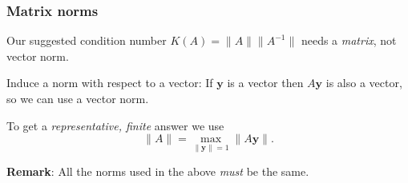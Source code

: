 \documentclass{beamer}
\newcommand{\bfm}[1]{{\boldsymbol{#1}}}
\begin{document}
 \begin{frame}
   \frametitle{Matrix norms}

   Our suggested condition number $K(A) = \| A \| \| A^{-1} \|$ needs
   a \emph{matrix}, not vector norm.

   \vspace{1ex}

   Induce a norm with respect to a vector: If $\bfm{y}$ is a vector
   then $A\bfm{y}$ is also a vector, so we can use a vector
   norm. \pause

   \vspace{1ex}

   To get a \emph{representative, finite} answer we use
   \begin{equation*}
     \| A \| = \max_{\| \bfm{y} \| = 1} \| A \bfm{y} \|.
   \end{equation*}

   \vspace{1ex}

   {\bf Remark}: All the norms used in the above \emph{must} be the
   same.


 \end{frame}
\end{document}
